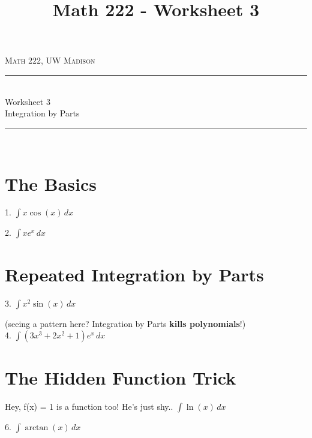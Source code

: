 \documentclass[paper=a4, fontsize=11pt]{scrartcl} %
\title{Math 222 - Worksheet 3}
\numberwithin{equation}{section} %
\numberwithin{figure}{section} %
\numberwithin{table}{section} %
\newcommand{\horrule}[1]{\rule{\linewidth}{#1}} %
\begin{document}
{
\normalfont \normalsize 
\begin{flushright}
\textsc{Math 222, UW Madison}
\end{flushright}
{\center
\horrule{0.5pt} \\[0.4cm] %
{\huge Worksheet 3}\\
Integration by Parts \\ %
\horrule{2pt} \\[0.5cm] %
}}



\section*{The Basics}

1. \quad $\displaystyle \int x\cos(x)\,dx$

\vfill

2. \quad $\displaystyle \int x e^{x}\,dx$

\vfill

\section*{Repeated Integration by Parts}

3. \quad $\displaystyle \int x^2 \sin(x)\,dx$

\vfill
\newpage

{\center (seeing a pattern here?  Integration by Parts {\bfseries kills polynomials}!)}\\
4. \quad $\displaystyle \int (3x^3 + 2x^2 + 1)e^x\,dx$

\vfill

\section*{The Hidden Function Trick}

Hey, f(x) = 1 is a function too!  He's just shy.\newline{}. \quad $\displaystyle \int \ln(x)\,dx$

\vfill

6. \quad $\displaystyle \int \arctan(x)\,dx$

\vfill
\newpage
\end{document}
